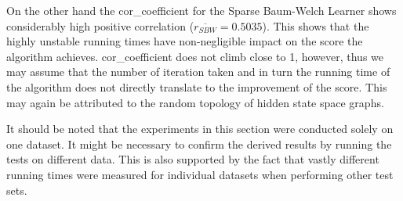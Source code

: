 On the other hand the \gls{cor_coefficient} for the Sparse Baum-Welch Learner shows considerably high positive correlation ($\overline{r_{SBW}}=0.5035$). This shows that the highly unstable running times have non-negligible impact on the score the algorithm achieves. \gls{cor_coefficient} does not climb close to 1, however, thus we may assume that the number of iteration taken and in turn the running time of the algorithm does not directly translate to the improvement of the score. This may again be attributed to the random topology of hidden state space graphs.

It should be noted that the experiments in this section were conducted solely on one dataset. It might be necessary to confirm the derived results by running the tests on different data. This is also supported by the fact that vastly different running times were measured for individual datasets when performing other test sets.
